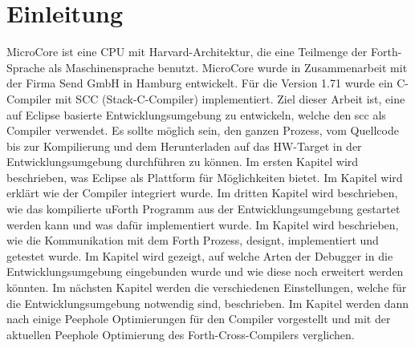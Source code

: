 \chapter{Einleitung}

MicroCore ist eine CPU mit Harvard-Architektur, die eine Teilmenge der Forth-Sprache als Maschinensprache benutzt. MicroCore wurde in Zusammenarbeit mit der Firma Send GmbH in Hamburg entwickelt. Für die Version 1.71 wurde ein C-Compiler mit SCC (Stack-C-Compiler) implementiert. Ziel dieser Arbeit ist, eine auf Eclipse basierte Entwicklungsumgebung zu entwickeln, welche den scc als Compiler verwendet. Es sollte möglich sein, den ganzen Prozess, vom Quellcode bis zur Kompilierung und dem Herunterladen auf das HW-Target in der Entwicklungsumgebung durchführen zu können. Im ersten Kapitel  wird beschrieben, was Eclipse als Plattform für Möglichkeiten bietet. Im Kapitel  wird erklärt wie der Compiler integriert wurde. Im dritten Kapitel  wird beschrieben, wie das kompilierte uForth Programm aus der Entwicklungsumgebung gestartet werden kann und was dafür implementiert wurde. Im Kapitel  wird beschrieben, wie die Kommunikation mit dem Forth Prozess, designt, implementiert und getestet wurde. Im Kapitel  wird gezeigt, auf welche Arten der Debugger in die Entwicklungsumgebung eingebunden wurde und wie diese noch erweitert werden könnten. Im nächsten Kapitel  werden die verschiedenen Einstellungen, welche für die Entwicklungsumgebung notwendig sind, beschrieben. Im Kapitel  werden dann nach einige Peephole Optimierungen für den Compiler vorgestellt und mit der aktuellen Peephole Optimierung des Forth-Cross-Compilers verglichen.
